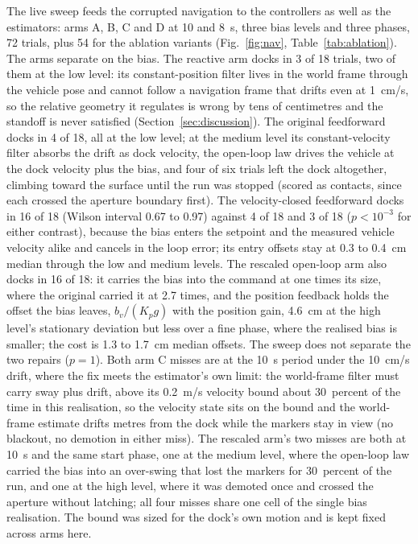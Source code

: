 The live sweep feeds the corrupted navigation to the controllers as well as the estimators: arms A, B, C and D at 10 and 8~s, three bias levels and three phases, 72 trials, plus 54 for the ablation variants (Fig.~\ref{fig:nav}, Table~\ref{tab:ablation}). The arms separate on the bias. The reactive arm docks in 3 of 18 trials, two of them at the low level: its constant-position filter lives in the world frame through the vehicle pose and cannot follow a navigation frame that drifts even at 1~cm/s, so the relative geometry it regulates is wrong by tens of centimetres and the standoff is never satisfied (Section~\ref{sec:discussion}). The original feedforward docks in 4 of 18, all at the low level; at the medium level its constant-velocity filter absorbs the drift as dock velocity, the open-loop law drives the vehicle at the dock velocity plus the bias, and four of six trials left the dock altogether, climbing toward the surface until the run was stopped (scored as contacts, since each crossed the aperture boundary first). The velocity-closed feedforward docks in 16 of 18 (Wilson interval 0.67 to 0.97) against 4 of 18 and 3 of 18 ($p < 10^{-3}$ for either contrast), because the bias enters the setpoint and the measured vehicle velocity alike and cancels in the loop error; its entry offsets stay at 0.3 to 0.4~cm median through the low and medium levels. The rescaled open-loop arm also docks in 16 of 18: it carries the bias into the command at one times its size, where the original carried it at 2.7 times, and the position feedback holds the offset the bias leaves, $b_v / (K_p g)$ with the position gain, 4.6~cm at the high level's stationary deviation but less over a fine phase, where the realised bias is smaller; the cost is 1.3 to 1.7~cm median offsets. The sweep does not separate the two repairs ($p = 1$). Both arm C misses are at the 10~s period under the 10~cm/s drift, where the fix meets the estimator's own limit: the world-frame filter must carry sway plus drift, above its 0.2~m/s velocity bound about 30~percent of the time in this realisation, so the velocity state sits on the bound and the world-frame estimate drifts metres from the dock while the markers stay in view (no blackout, no demotion in either miss). The rescaled arm's two misses are both at 10~s and the same start phase, one at the medium level, where the open-loop law carried the bias into an over-swing that lost the markers for 30~percent of the run, and one at the high level, where it was demoted once and crossed the aperture without latching; all four misses share one cell of the single bias realisation. The bound was sized for the dock's own motion and is kept fixed across arms here.

